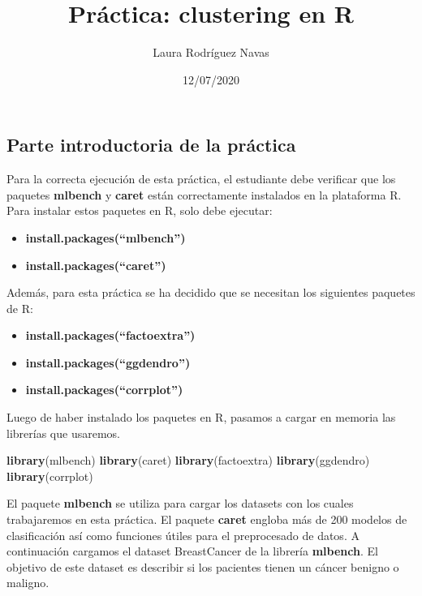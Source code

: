 \documentclass[]{article}
\title{Práctica: clustering en R}
\author{Laura Rodríguez Navas}
\date{12/07/2020}
\newenvironment{Shaded}{\begin{snugshade}}{\end{snugshade}}
\newcommand{\KeywordTok}[1]{\textcolor[rgb]{0.13,0.29,0.53}{\textbf{#1}}}
\newcommand{\NormalTok}[1]{#1}
\providecommand{\tightlist}{%
  \setlength{\itemsep}{0pt}\setlength{\parskip}{0pt}}
\begin{document}
\maketitle

\hypertarget{parte-introductoria-de-la-pruxe1ctica}{%
\subsection{Parte introductoria de la
práctica}\label{parte-introductoria-de-la-pruxe1ctica}}

Para la correcta ejecución de esta práctica, el estudiante debe
verificar que los paquetes \textbf{mlbench} y \textbf{caret} están
correctamente instalados en la plataforma R. Para instalar estos
paquetes en R, solo debe ejecutar:

\begin{itemize}
\tightlist
\item
  \textbf{install.packages(``mlbench'')}
\item
  \textbf{install.packages(``caret'')}
\end{itemize}

Además, para esta práctica se ha decidido que se necesitan los
siguientes paquetes de R:

\begin{itemize}
\tightlist
\item
  \textbf{install.packages(``factoextra'')}
\item
  \textbf{install.packages(``ggdendro'')}
\item
  \textbf{install.packages(``corrplot'')}
\end{itemize}

Luego de haber instalado los paquetes en R, pasamos a cargar en memoria
las librerías que usaremos.

\begin{Shaded}
\begin{Highlighting}[]
\KeywordTok{library}\NormalTok{(mlbench)}
\KeywordTok{library}\NormalTok{(caret)}
\KeywordTok{library}\NormalTok{(factoextra)}
\KeywordTok{library}\NormalTok{(ggdendro)}
\KeywordTok{library}\NormalTok{(corrplot)}
\end{Highlighting}
\end{Shaded}

El paquete \textbf{mlbench} se utiliza para cargar los datasets con los
cuales trabajaremos en esta práctica. El paquete \textbf{caret} engloba
más de 200 modelos de clasificación así como funciones útiles para el
preprocesado de datos. A continuación cargamos el dataset BreastCancer
de la librería \textbf{mlbench}. El objetivo de este dataset es
describir si los pacientes tienen un cáncer benigno o maligno.
\end{document}

